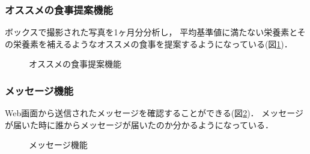 \documentclass[../report]{subfiles}
\begin{document}
\subsubsection{オススメの食事提案機能}
ボックスで撮影された写真を1ヶ月分分析し， 平均基準値に満たない栄養素とその栄養素を補えるようなオススメの食事を提案するようになっている(図\ref{fig:5_tv-suggestion})．

\begin{figure}[htbp]
    \begin{center}
        \caption{オススメの食事提案機能}
        \label{fig:5_tv-suggestion}
    \end{center}
\end{figure}

\subsubsection{メッセージ機能}
Web画面から送信されたメッセージを確認することができる(図\ref{fig:5_tv-message})．
メッセージが届いた時に誰からメッセージが届いたのか分かるようになっている．

\begin{figure}[htbp]
    \begin{center}
        \caption{メッセージ機能}
        \label{fig:5_tv-message}
    \end{center}
\end{figure}
\end{document}
